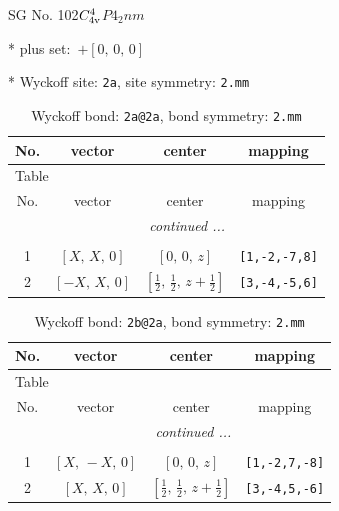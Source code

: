 \documentclass[fleqn,8pt]{jsarticle}
\begin{document}
\setcounter{MaxMatrixCols}{32}

\renewcommand{\tablename}{Table~}
\renewcommand{\figurename}{Figure~}
\begin{center}
\LARGE
SG No. 102\quad$C_{\rm 4v}^{4}$\quad$P4_2nm$\quad[ tetragonal ]
\end{center}

* plus set:\,\,\,$+\left[ 0,\, 0,\, 0 \right]$


* Wyckoff site: {\tt 2a}, site symmetry: {\tt 2.mm}
\renewcommand{\arraystretch}{1.2}
\begin{longtable}{cccc}
\caption{Wyckoff bond: {\tt 2a@2a}, bond symmetry: {\tt 2.mm}}
 \\
 \hline \hline
No. & vector & center & mapping \\ \hline \endfirsthead

\multicolumn{3}{l}{\tablename\ \thetable{}} \\
 \hline \hline
No. & vector & center & mapping \\ \hline \endhead

 \hline \hline
\multicolumn{3}{r}{\footnotesize\it continued ...} \\ \endfoot

 \hline \hline
\multicolumn{3}{r}{} \\ \endlastfoot

1 & $\left[ X,\, X,\, 0 \right]$ & $\left[ 0,\, 0,\, z \right]$ & {\tt [1,-2,-7,8]} \\ \hline
2 & $\left[ - X,\, X,\, 0 \right]$ & $\left[ \frac{1}{2},\, \frac{1}{2},\, z + \frac{1}{2} \right]$ & {\tt [3,-4,-5,6]} \\
\end{longtable}
\renewcommand{\arraystretch}{1.2}
\begin{longtable}{cccc}
\caption{Wyckoff bond: {\tt 2b@2a}, bond symmetry: {\tt 2.mm}}
 \\
 \hline \hline
No. & vector & center & mapping \\ \hline \endfirsthead

\multicolumn{3}{l}{\tablename\ \thetable{}} \\
 \hline \hline
No. & vector & center & mapping \\ \hline \endhead

 \hline \hline
\multicolumn{3}{r}{\footnotesize\it continued ...} \\ \endfoot

 \hline \hline
\multicolumn{3}{r}{} \\ \endlastfoot

1 & $\left[ X,\, - X,\, 0 \right]$ & $\left[ 0,\, 0,\, z \right]$ & {\tt [1,-2,7,-8]} \\ \hline
2 & $\left[ X,\, X,\, 0 \right]$ & $\left[ \frac{1}{2},\, \frac{1}{2},\, z + \frac{1}{2} \right]$ & {\tt [3,-4,5,-6]} \\
\end{longtable}
\end{document}

